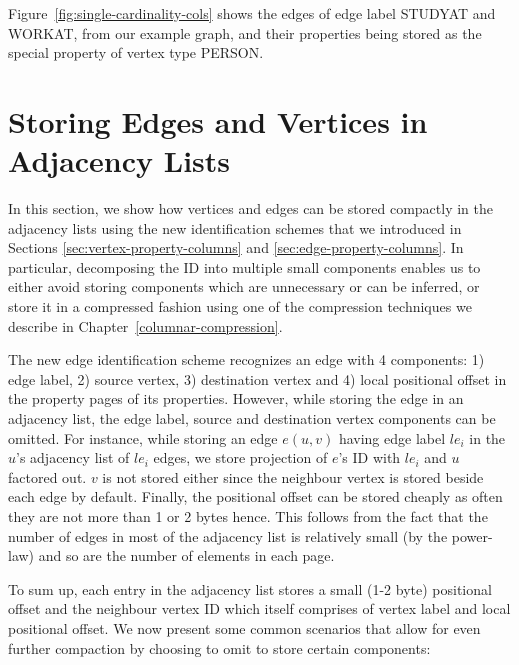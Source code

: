 Figure~\ref{fig:single-cardinality-cols} shows the edges of edge label STUDYAT and WORKAT, from our example graph, and their properties being stored as the special property of vertex type PERSON. 

\section{Storing Edges and Vertices in Adjacency Lists}
\label{sec:storage-optimizations}

In this section, we show how vertices and edges can be stored compactly in the adjacency lists using the new identification schemes that we introduced in Sections \ref{sec:vertex-property-columns} and \ref{sec:edge-property-columns}. In particular, decomposing the ID into multiple small components enables us to either avoid storing components which are unnecessary or can be inferred, or store it in a compressed fashion using one of the compression techniques we describe in Chapter~\ref{columnar-compression}.

The new edge identification scheme recognizes an edge with 4 components: 1) edge label, 2) source vertex, 3) destination vertex and 4) local positional offset in the property pages of its properties. However, while storing the edge in an adjacency list, the edge label, source and destination vertex components can be omitted. For instance, while storing an edge $e(u,v)$ having edge label $le_i$ in the $u$'s adjacency list of $le_i$ edges, we store projection of $e$'s ID with $le_i$ and $u$ factored out. $v$ is not stored either since the neighbour vertex is stored beside each edge by default. Finally, the positional offset can be stored cheaply as often they are not more than 1 or 2 bytes hence. This follows from the fact that the number of edges in most of the adjacency list is relatively small (by the power-law) and so are the number of elements in each page. 

To sum up, each entry in the adjacency list stores a small (1-2 byte) positional offset and the neighbour vertex ID which itself comprises of vertex label and local positional offset. We now present some common scenarios that allow for even further compaction by choosing to omit to store certain components:

